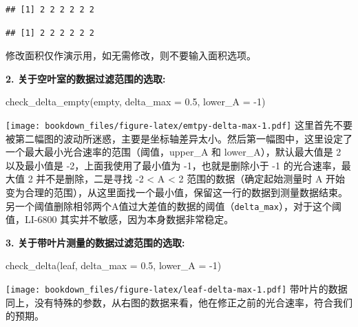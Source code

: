 \documentclass[
]{krantz}
\makeatletter
\newenvironment{Shaded}{\begin{snugshade}}{\end{snugshade}}
\newcommand{\AttributeTok}[1]{\textcolor[rgb]{0.77,0.63,0.00}{#1}}
\newcommand{\DecValTok}[1]{\textcolor[rgb]{0.00,0.00,0.81}{#1}}
\newcommand{\FloatTok}[1]{\textcolor[rgb]{0.00,0.00,0.81}{#1}}
\newcommand{\FunctionTok}[1]{\textcolor[rgb]{0.00,0.00,0.00}{#1}}
\newcommand{\NormalTok}[1]{#1}
\newcommand{\SpecialCharTok}[1]{\textcolor[rgb]{0.00,0.00,0.00}{#1}}
\newenvironment{kframe}{%
\medskip{}
\setlength{\fboxsep}{.8em}
 \def\at@end@of@kframe{}%
 \ifinner\ifhmode%
  \def\at@end@of@kframe{\end{minipage}}%
  \begin{minipage}{\columnwidth}%
 \fi\fi%
 \def\FrameCommand##1{\hskip\@totalleftmargin \hskip-\fboxsep
 \colorbox{shadecolor}{##1}\hskip-\fboxsep
     \hskip-\linewidth \hskip-\@totalleftmargin \hskip\columnwidth}%
 \MakeFramed {\advance\hsize-\width
   \@totalleftmargin\z@ \linewidth\hsize
   \@setminipage}}%
 {\par\unskip\endMakeFramed%
 \at@end@of@kframe}
\renewenvironment{Shaded}{\begin{kframe}}{\end{kframe}}
\makeatother
\begin{document}
\begin{verbatim}
## [1] 2 2 2 2 2 2
\end{verbatim}

\begin{Shaded}
\end{Shaded}

\begin{verbatim}
## [1] 2 2 2 2 2 2
\end{verbatim}

修改面积仅作演示用，如无需修改，则不要输入面积选项。

\textbf{2. 关于空叶室的数据过滤范围的选取:}

\begin{Shaded}
\begin{Highlighting}[]
\FunctionTok{check\_delta\_empty}\NormalTok{(empty, }\AttributeTok{delta\_max =} \FloatTok{0.5}\NormalTok{, }\AttributeTok{lower\_A =} \SpecialCharTok{{-}}\DecValTok{1}\NormalTok{)}
\end{Highlighting}
\end{Shaded}

\texttt{[image: bookdown\_files/figure-latex/emtpy-delta-max-1.pdf]}
这里首先不要被第二幅图的波动所迷惑，主要是坐标轴差异太小。然后第一幅图中，这里设定了一个最大最小光合速率的范围（阈值，upper\_A 和 lower\_A），默认最大值是 2 以及最小值是 -2，上面我使用了最小值为 -1，也就是删除小于 -1 的光合速率，最大值 2 并不是删除，二是寻找 -2 \textless{} A \textless{} 2 范围的数据（确定起始测量时 A 开始变为合理的范围），从这里面找一个最小值，保留这一行的数据到测量数据结束。 另一个阈值删除相邻两个A值过大差值的数据的阈值（\texttt{delta\_max}），对于这个阈值，LI-6800 其实并不敏感，因为本身数据非常稳定。

\textbf{3. 关于带叶片测量的数据过滤范围的选取:}

\begin{Shaded}
\begin{Highlighting}[]
\FunctionTok{check\_delta}\NormalTok{(leaf, }\AttributeTok{delta\_max =} \FloatTok{0.5}\NormalTok{, }\AttributeTok{lower\_A =} \SpecialCharTok{{-}}\DecValTok{1}\NormalTok{)}
\end{Highlighting}
\end{Shaded}

\texttt{[image: bookdown\_files/figure-latex/leaf-delta-max-1.pdf]}
带叶片的数据同上，没有特殊的参数，从右图的数据来看，他在修正之前的光合速率，符合我们的预期。
\end{document}
